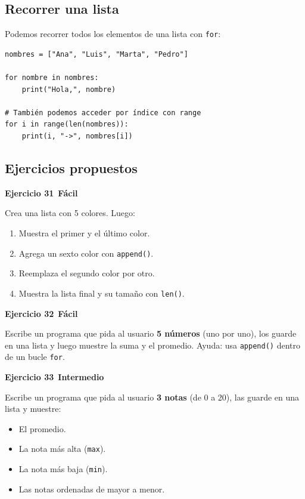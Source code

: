 \documentclass[11pt,a4paper]{article}
\newcommand{\facil}{\textcolor{verdeSignal}{\faIcon{circle}\,\textbf{Fácil}}}
\newcommand{\intermedio}{\textcolor{naranjaVivo}{\faIcon{circle}\,\textbf{Intermedio}}}
\begin{document}
\subsection{Recorrer una lista}

Podemos recorrer todos los elementos de una lista con \texttt{for}:

\begin{cajaEjemplo}
\begin{lstlisting}[style=pythonStyle, caption={Recorriendo una lista}]
nombres = ["Ana", "Luis", "Marta", "Pedro"]

for nombre in nombres:
    print("Hola,", nombre)

# También podemos acceder por índice con range
for i in range(len(nombres)):
    print(i, "->", nombres[i])
\end{lstlisting}
\end{cajaEjemplo}

\subsection{Ejercicios propuestos}

\begin{cajaEjercicio}
\textbf{Ejercicio 31} \facil

Crea una lista con 5 colores. Luego:
\begin{enumerate}
    \item Muestra el primer y el último color.
    \item Agrega un sexto color con \texttt{append()}.
    \item Reemplaza el segundo color por otro.
    \item Muestra la lista final y su tamaño con \texttt{len()}.
\end{enumerate}
\end{cajaEjercicio}

\begin{cajaEjercicio}
\textbf{Ejercicio 32} \facil

Escribe un programa que pida al usuario \textbf{5 números} (uno por uno), los guarde en una lista y luego muestre la suma y el promedio. Ayuda: usa \texttt{append()} dentro de un bucle \texttt{for}.
\end{cajaEjercicio}

\begin{cajaEjercicio}
\textbf{Ejercicio 33} \intermedio

Escribe un programa que pida al usuario \textbf{3 notas} (de 0 a 20), las guarde en una lista y muestre:
\begin{itemize}
    \item El promedio.
    \item La nota más alta (\texttt{max}).
    \item La nota más baja (\texttt{min}).
    \item Las notas ordenadas de mayor a menor.
\end{itemize}
\end{cajaEjercicio}
\end{document}
